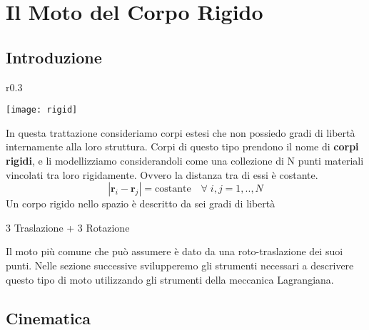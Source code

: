 \setcounter{chapter}{3}
\chapter{Il Moto del Corpo Rigido}
\section{Introduzione}
\begin{wrapfigure}{r}{0.3\textwidth}
\vspace{-0.4in}
  \begin{center}
    \texttt{[image: rigid]}
  \end{center}
\end{wrapfigure}
In questa trattazione consideriamo corpi estesi che non possiedo gradi di libert\`{a} internamente alla loro struttura. Corpi di questo tipo prendono il nome di \textbf{corpi rigidi}, e li modellizziamo considerandoli come una collezione di N punti materiali vincolati tra loro rigidamente. Ovvero la distanza tra di essi \`{e} costante.
\begin{equation}
	|\bm{r}_{i} - \bm{r}_j| = \text{costante} \quad \forall \; i,j = 1,..,N
\end{equation}
Un corpo rigido nello spazio \`{e} descritto da sei gradi di libert\`{a}
\begin{center}
	3 Traslazione + 3 Rotazione
\end{center}
Il moto pi\`{u} comune che pu\`{o} assumere \`{e} dato da una roto-traslazione dei suoi punti. Nelle sezione successive svilupperemo gli strumenti necessari a descrivere questo tipo di moto utilizzando gli strumenti della meccanica Lagrangiana.

\section{Cinematica}
